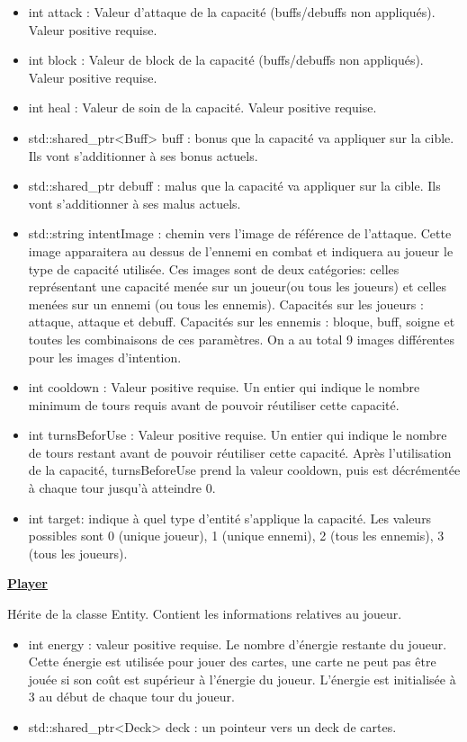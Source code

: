 \begin{itemize}
    \item int attack : Valeur d'attaque de la capacité (buffs/debuffs non appliqués). Valeur positive requise.
    \item int block : Valeur de block de la capacité (buffs/debuffs non appliqués). Valeur positive requise.
    \item int heal : Valeur de soin de la capacité. Valeur positive requise.
    \item std::shared\_ptr<Buff>  buff : bonus que la capacité va appliquer sur la cible. Ils vont s'additionner à ses bonus actuels.
    \item std::shared\_ptr debuff : malus que la capacité va appliquer sur la cible. Ils vont s'additionner à ses malus actuels.
    \item std::string intentImage : chemin vers l'image de référence de l'attaque. Cette image apparaitera au dessus de l'ennemi en combat et indiquera au joueur le type de capacité utilisée. Ces images sont de deux catégories: celles représentant une capacité menée sur un joueur(ou tous les joueurs) et celles menées sur un ennemi (ou tous les ennemis).
    Capacités sur les joueurs : attaque, attaque et debuff.
    Capacités sur les ennemis : bloque, buff, soigne et toutes les combinaisons de ces paramètres. On a au total 9 images différentes pour les images d'intention.
    \item int cooldown : Valeur positive requise. Un entier qui indique le nombre minimum de tours requis avant de pouvoir réutiliser cette capacité.
    \item int turnsBeforUse : Valeur positive requise. Un entier qui indique le nombre de tours restant avant de pouvoir réutiliser cette capacité. Après l'utilisation de la capacité, turnsBeforeUse prend la valeur cooldown, puis est décrémentée à chaque tour jusqu'à atteindre 0.
    \item int target: indique à quel type d'entité s'applique la capacité. Les valeurs possibles sont 0 (unique joueur), 1 (unique ennemi), 2 (tous les ennemis), 3 (tous les joueurs).
\end{itemize}


\underline{\textbf{Player}}
\par Hérite de la classe Entity. Contient les informations relatives au joueur.
\begin{itemize}
    \item int energy : valeur positive requise. Le nombre d'énergie restante du joueur. Cette énergie est utilisée pour jouer des cartes, une carte ne peut pas être jouée si son coût est supérieur à l'énergie du joueur. L'énergie est initialisée à 3 au début de chaque tour du joueur.
    \item std::shared\_ptr<Deck>  deck : un pointeur vers un deck de cartes.
\end{itemize}

